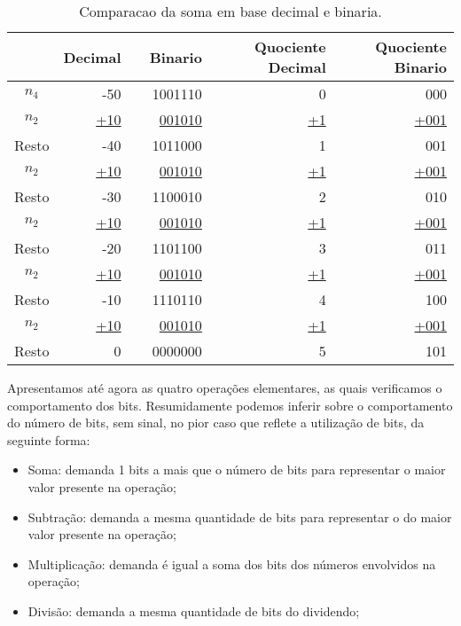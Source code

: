 \documentclass[12pt]{article}
\begin{document}
\begin{table}[ht]
	\centering
    \caption{Comparacao da soma em base decimal e binaria.}
    \begin{tabular}{crrrrr}
    \hline
    	  & Decimal & & Binario & Quociente Decimal & Quociente Binario \\
    \hline  
    $n_4$ & -50 					& & 1001110
&0& 000 \\
    $n_2$ & \underline{+10} 	& & \underline{001010}  &\underline{+1}&
\underline{+001} \\
    Resto & -40      			& & 1011000  			&1& 001
\\
    $n_2$ & \underline{+10} 	& & \underline{001010}  &\underline{+1}&
\underline{+001} \\
    Resto & -30      			& & 1100010 			&2& 010
\\
    $n_2$ & \underline{+10} 	& & \underline{001010}  &\underline{+1}&
\underline{+001} \\
    Resto & -20      			& & 1101100  			&3& 011
\\
    $n_2$ & \underline{+10} 	& & \underline{001010}  &\underline{+1}&
\underline{+001} \\
    Resto & -10      			& & 1110110  			&4& 100
\\
    $n_2$ & \underline{+10} 	& & \underline{001010}  &\underline{+1}&
\underline{+001} \\
    Resto & 0      				& & 0000000
&5& 101 \\
    \hline
	\end{tabular}
    \label{tab:08}
\end{table}

Apresentamos até agora as quatro operações elementares, as quais verificamos o
comportamento dos bits. Resumidamente podemos inferir sobre o comportamento do
número de bits, sem sinal, no pior caso que reflete a utilização de bits, da
seguinte forma:

\begin{itemize}
\item Soma: demanda 1 bits a mais que o número de bits para representar o maior
valor presente na operação;
\item Subtração: demanda a mesma quantidade de bits para representar o do maior
valor presente na operação;
\item Multiplicação: demanda é igual a soma dos bits dos números envolvidos na
operação;
\item Divisão: demanda a mesma quantidade de bits do dividendo;
\end{itemize}
\end{document}
